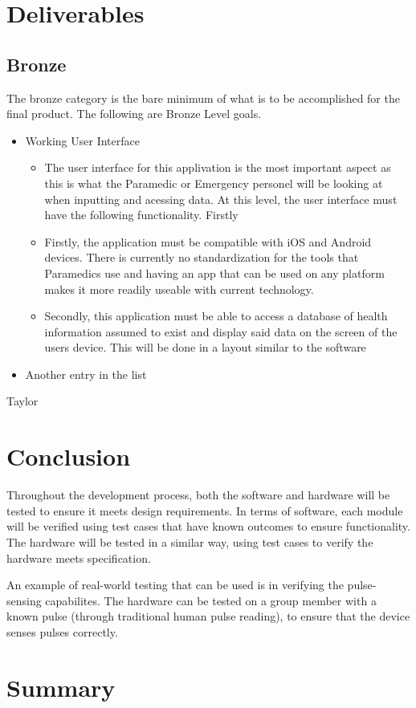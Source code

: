 \documentclass{article}
\begin{document}
\fi

\section{Deliverables}
\subsection{Bronze}
The bronze category is the bare minimum of what is to be accomplished for the final product. The following are Bronze Level goals.
\begin{itemize}
  \item Working User Interface
	\begin{itemize}
	\item The user interface for this applivation is the most important aspect as this is what the Paramedic or Emergency personel will be looking at when inputting and acessing data. At this level, the user interface must have the following functionality. Firstly
	\item Firstly, the application must be compatible with iOS and Android devices. There is currently no standardization for the tools that Paramedics use and having an app that can be used on any platform makes it more readily useable with current technology.
	\item Secondly, this application must be able to access a database of health information assumed to exist and display said data on the screen of the users device. This will be done in a layout similar to the software
	\end{itemize}
  \item Another entry in the list
\end{itemize}
Taylor

\section{Conclusion}

Throughout the development process, both the software and hardware will be tested to ensure it meets design requirements. In terms of software, each module will be verified using test cases that have known outcomes to ensure functionality. The hardware will be tested in a similar way, using test cases to verify the hardware meets specification.

An example of real-world testing that can be used is in verifying the pulse-sensing capabilites. The hardware can be tested on a group member with a known pulse (through traditional human pulse reading), to ensure that the device senses pulses correctly.

\section{Summary}
\end{document}
